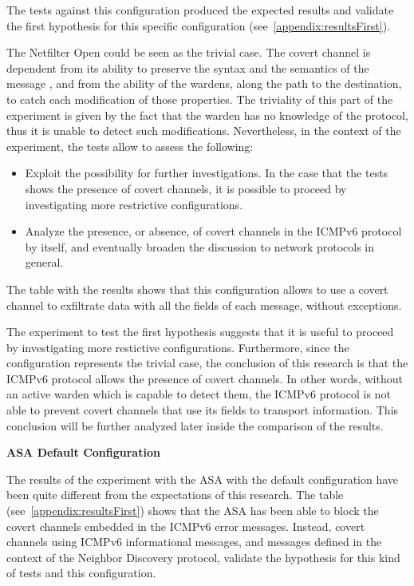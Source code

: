 \documentclass[12pt]{article}
\begin{document}
The tests against this configuration produced the expected results and validate the first hypothesis for this specific configuration (see~\cref{appendix:resultsFirst}).

The Netfilter Open could be seen as the trivial case. The covert channel is dependent from its ability to preserve the syntax and the semantics of the message \cite{lewandowski}, and from the ability of the wardens, along the path to the destination, to catch each modification of those properties. The triviality of this part of the experiment is given by the fact that the warden has no knowledge of the protocol, thus it is unable to detect such modifications. Nevertheless, in the context of the experiment, the tests allow to assess the following:
\vspace{-5pt}
\begin{itemize}[noitemsep,topsep=0pt,partopsep=0pt]
 \item Exploit the possibility for further investigations. In the case that the tests shows the presence of covert channels, it is possible to proceed by investigating more restrictive configurations.
 \item Analyze the presence, or absence, of covert channels in the ICMPv6 protocol by itself, and eventually broaden the discussion to network protocols in general.
\end{itemize}

The table with the results shows that this configuration allows to use a covert channel to exfiltrate data with all the fields of each message, without exceptions.

The experiment to test the first hypothesis suggests that it is useful to proceed by investigating more restictive configurations. Furthermore, since the configuration represents the trivial case, the conclusion of this research is that the ICMPv6 protocol allows the presence of covert channels. In other words, without an active warden which is capable to detect them, the ICMPv6 protocol is not able to prevent covert channels that use its fields to transport information. This conclusion will be further analyzed later inside the comparison of the results.


\textbf{ASA Default Configuration}
\label{resultsFirstASADefault}

The results of the experiment with the ASA with the default configuration have been quite different from the expectations of this research. The table (see~\cref{appendix:resultsFirst}) shows that the ASA has been able to block the covert channels embedded in the ICMPv6 error messages. Instead, covert channels using ICMPv6 informational messages, and messages defined in the context of the Neighbor Discovery protocol, validate the hypothesis for this kind of tests and this configuration.
\end{document}
